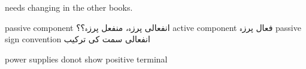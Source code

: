 needs changing in the other books.

passive component انفعالی پرزہ، منفعل پرزہ؟؟
active component فعال پرزہ
passive sign convention انفعالی سمت کی ترکیب

power supplies donot show positive terminal

